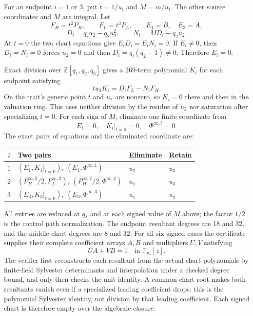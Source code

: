 \documentclass[11pt,a4paper]{article}
\theoremstyle{remark}\newtheorem{remark}[theorem]{Remark}
\newcommand{\Ab}{\overline A}\newcommand{\Bb}{\overline B}
\begin{document}
For an endpoint $i=1$ or $3$, put $t=1/u_i$ and $M=m/u_i$.
The other source coordinates and $M$ are integral. Let
\[
 F_H=t^2P_H,\qquad F_L=t^3P_L,\qquad
 E_1=\Bb,\quad E_3=\Ab,
\]
\[
 D_i=q_i\alpha_2-q_2u_2^2,\qquad N_i=MD_i-q_2u_2.
\]
At $t=0$ the two chart equations give $E_iD_i=E_iN_i=0$.
If $E_i\ne0$, then $D_i=N_i=0$ forces $u_2=0$ and then
$D_i=q_i(q_2-1)\ne0$. Therefore $E_i=0$.

Exact division over $\mathbb Z[q_1,q_2,q_3]$ gives a 269-term
polynomial $K_i$ for each endpoint satisfying
\begin{equation}\label{generic:endpointcolon}
 t u_2K_i=D_iF_L-N_iF_H.
\end{equation}
On the trait's generic point $t$ and $u_2$ are nonzero, so $K_i=0$
there and then in the valuation ring. This uses neither division by the
residue of $u_2$ nor saturation after specializing $t=0$.
For each sign of $M$, eliminate one finite coordinate from
\[
 E_i=0,\quad K_i|_{t=0}=0,\quad \Phi^{\infty,i}=0.
\]
The exact pairs of equations and the eliminated coordinate are:
\begin{center}\small
\begin{tabular}{@{}clll@{}}\toprule
$i$ & Two pairs & Eliminate & Retain\\\midrule
$1$ & $(E_1,K_1|_{t=0}),\ (E_1,\Phi^{\infty,1})$ & $u_2$ & $u_3$\\
$2$ & $(P_H^{\infty,2}/2,P_L^{\infty,2}),\ (P_H^{\infty,2}/2,\Phi^{\infty,2})$
 & $u_1$ & $u_3$\\
$3$ & $(E_3,K_3|_{t=0}),\ (E_3,\Phi^{\infty,3})$ & $u_1$ & $u_2$\\
\bottomrule\end{tabular}
\end{center}
All entries are reduced at $q_*$ and at each signed value of $M$ above;
the factor $1/2$ is the control path normalization. The endpoint
resultant degrees are 18 and 32, and the middle-chart degrees are 8 and 32.
For all six signed cases the
certificate supplies their complete coefficient arrays $A,B$ and
multipliers $U,V$ satisfying
\[
 UA+VB=1\quad\text{in }\mathbb F_{p_*}[z].
\]
The verifier first reconstructs each resultant from the actual chart
polynomials by finite-field Sylvester determinants and interpolation
under a checked degree bound, and only then checks the unit identity.
A common chart root makes both resultants vanish even if a specialized
leading coefficient drops: this is the polynomial Sylvester identity,
not division by that leading coefficient. Each signed chart is therefore
empty over the algebraic closure.
\end{document}
